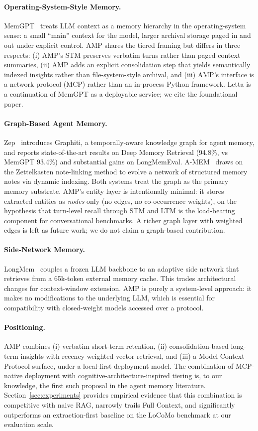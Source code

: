 \paragraph{Operating-System-Style Memory.} MemGPT~\citep{memgpt} treats LLM context as a memory hierarchy in the operating-system sense: a small ``main'' context for the model, larger archival storage paged in and out under explicit control. AMP shares the tiered framing but differs in three respects: (i) AMP's STM preserves verbatim turns rather than paged context summaries, (ii) AMP adds an explicit consolidation step that yields semantically indexed insights rather than file-system-style archival, and (iii) AMP's interface is a network protocol (MCP) rather than an in-process Python framework. Letta is a continuation of MemGPT as a deployable service; we cite the foundational paper.

\paragraph{Graph-Based Agent Memory.} Zep~\citep{zep} introduces Graphiti, a temporally-aware knowledge graph for agent memory, and reports state-of-the-art results on Deep Memory Retrieval (94.8\%, vs MemGPT 93.4\%) and substantial gains on LongMemEval. A-MEM~\citep{amem} draws on the Zettelkasten note-linking method to evolve a network of structured memory notes via dynamic indexing. Both systems treat the graph as the primary memory substrate. AMP's entity layer is intentionally minimal: it stores extracted entities as \emph{nodes} only (no edges, no co-occurrence weights), on the hypothesis that turn-level recall through STM and LTM is the load-bearing component for conversational benchmarks. A richer graph layer with weighted edges is left as future work; we do not claim a graph-based contribution.

\paragraph{Side-Network Memory.} LongMem~\citep{longmem} couples a frozen LLM backbone to an adaptive side network that retrieves from a 65k-token external memory cache. This trades architectural changes for context-window extension. AMP is purely a system-level approach: it makes no modifications to the underlying LLM, which is essential for compatibility with closed-weight models accessed over a protocol.

\paragraph{Positioning.} AMP combines (i) verbatim short-term retention, (ii) consolidation-based long-term insights with recency-weighted vector retrieval, and (iii) a Model Context Protocol surface, under a local-first deployment model. The combination of MCP-native deployment with cognitive-architecture-inspired tiering is, to our knowledge, the first such proposal in the agent memory literature. Section~\ref{sec:experiments} provides empirical evidence that this combination is competitive with naive RAG, narrowly trails Full Context, and significantly outperforms an extraction-first baseline on the LoCoMo benchmark at our evaluation scale.
